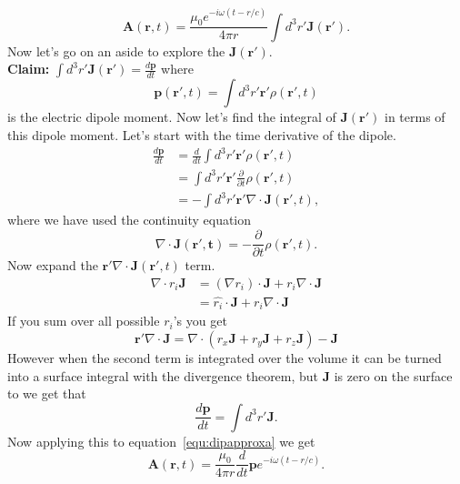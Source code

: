 \documentclass[12pt]{article}
\newcommand{\br}{\mathbf{r}}
\begin{document}
\begin{equation}
   \mathbf{A}(\br,t) = \frac{\mu_0e^{-i\omega(t-r/c)}}{4\pi r} \int d^3r' \mathbf{J}(\br').
   \label{equ:dipapproxa}
\end{equation}
Now let's go on an aside to explore the $\mathbf{J}(\br')$. \\
\textbf{Claim:} $\int d^3r' \mathbf{J}(\br') = \frac{d\mathbf{p}}{dt}$ where
\begin{equation}
   \mathbf{p}(\br',t) = \int d^3r' \br'\rho(\br',t)
\end{equation}
is the electric dipole moment. Now let's find the integral of $\mathbf{J}(\br')$ in terms of this dipole moment. Let's start with the time derivative of the dipole.
\begin{align}
   \frac{d\mathbf{p}}{dt} &= \frac{d}{dt}\int d^3r' \br'\rho(\br',t) \\
   &= \int d^3r' \br' \frac{\partial}{\partial t}\rho(\br',t) \\
   &= -\int d^3r' \br' \nabla \cdot \mathbf{J}(\br',t),
\end{align}
where we have used the continuity equation
\begin{equation}
   \nabla \cdot \mathbf{J(\br',t)} = -\frac{\partial}{\partial t} \rho(\br',t).
\end{equation}
Now expand the $\br' \nabla \cdot \mathbf{J}(\br',t)$ term.
\begin{align}
   \nabla \cdot r_i\mathbf{J} &= (\nabla r_i) \cdot \mathbf{J} + r_i\nabla\cdot\mathbf{J} \\
   &= \hat{r_i} \cdot \mathbf{J} + r_i\nabla\cdot\mathbf{J}
\end{align}
If you sum over all possible $r_i$'s you get
\begin{equation}
   \br'\nabla\cdot\mathbf{J} = \nabla\cdot (r_x\mathbf{J}+r_y\mathbf{J}+r_z\mathbf{J}) - \mathbf{J}
\end{equation}
However when the second term is integrated over the volume it can be turned into a surface integral with the divergence theorem, but $\mathbf{J}$ is zero on the surface to we get that
\begin{equation}
   \frac{d\mathbf{p}}{dt} = \int d^3r' \mathbf{J}.
\end{equation}
Now applying this to equation~\ref{equ:dipapproxa} we get
\begin{equation}
   \mathbf{A}(\br,t) = \frac{\mu_0}{4\pi r} \frac{d}{dt}\mathbf{p}e^{-i\omega(t-r/c)}.
\end{equation}
\color{red}{Is this right?}
\end{document}
